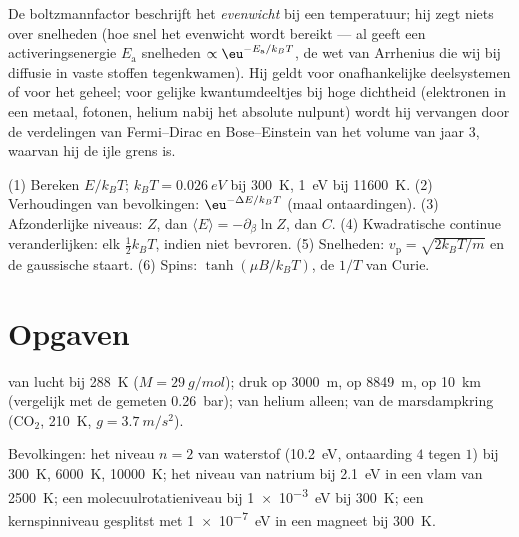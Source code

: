 \begin{remark}\label{rem:b2:boltzmann-factor:limits}
De boltzmannfactor beschrijft het \emph{evenwicht} bij een temperatuur; hij
zegt niets over snelheden (hoe snel het evenwicht wordt bereikt --- al
geeft een activeringsenergie $E_{\text{a}}$ snelheden
$\propto\eu^{-E_{\text{a}}/k_BT}$,
de wet van Arrhenius die wij bij diffusie in vaste stoffen tegenkwamen). Hij
geldt voor
onafhankelijke deelsystemen of voor het geheel; voor gelijke kwantumdeeltjes
bij hoge dichtheid (elektronen in een metaal, fotonen, helium nabij
het absolute nulpunt) wordt hij vervangen door de verdelingen van Fermi--Dirac en
Bose--Einstein van het volume van jaar 3, waarvan hij de ijle grens is.
\end{remark}

\begin{method}[Boltzmannschattingen]\label{meth:b2:boltzmann-factor:method}
(1) Bereken $E/k_BT$; $k_BT = \qty{0.026}{eV}$ bij \qty{300}{K}, \qty{1}{eV}
bij \qty{11600}{K}. (2) Verhoudingen van bevolkingen: $\eu^{-\Delta E/k_BT}$ (maal
ontaardingen). (3) Afzonderlijke niveaus: $Z$, dan
$\langle E\rangle =
-\partial_\beta\ln Z$, dan $C$. (4) Kwadratische
continue veranderlijken:
elk $\tfrac12k_BT$, indien niet bevroren. (5) Snelheden:
$v_{\text{p}} = \sqrt{2k_BT/m}$
en de gaussische staart. (6) Spins: $\tanh(\mu B/k_BT)$, de $1/T$ van Curie.
\end{method}

\section{Opgaven}

\begin{exercise}[$\star$]\label{exo:b2:boltzmann-factor:1}
 van lucht bij \qty{288}{K} ($M = \qty{29}{g/mol}$); druk op
\qty{3000}{m}, op \qty{8849}{m}, op \qty{10}{km} (vergelijk met de gemeten
\qty{0.26}{bar});  van helium alleen; van de marsdampkring
(CO$_2$, \qty{210}{K}, $g = \qty{3.7}{m/s^2}$).
\end{exercise}

\begin{exercise}[$\star$]\label{exo:b2:boltzmann-factor:2}
Bevolkingen: het niveau $n = 2$ van waterstof (\qty{10.2}{eV}, ontaarding $4$
tegen $1$) bij \qty{300}{K}, \qty{6000}{K}, \qty{10000}{K}; het niveau van
natrium bij \qty{2.1}{eV} in een vlam van \qty{2500}{K}; een
molecuulrotatieniveau bij
\qty{1e-3}{eV} bij \qty{300}{K}; een kernspinniveau gesplitst met \qty{1e-7}{eV} in
een magneet bij \qty{300}{K}.
\end{exercise}

